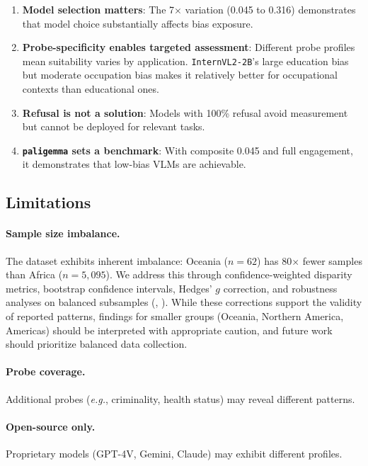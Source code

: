 \documentclass{article}
\newcommand{\model}[1]{\texttt{#1}}
\newcommand{\eg}{\textit{e.g.}}
\begin{document}
\begin{enumerate}[nosep,leftmargin=*]
    \item \textbf{Model selection matters}: The 7$\times$ variation (0.045 to 0.316) demonstrates that model choice substantially affects bias exposure.

    \item \textbf{Probe-specificity enables targeted assessment}: Different probe profiles mean suitability varies by application. \model{InternVL2-2B}'s large education bias but moderate occupation bias makes it relatively better for occupational contexts than educational ones.

    \item \textbf{Refusal is not a solution}: Models with 100\% refusal avoid measurement but cannot be deployed for relevant tasks.

    \item \textbf{\model{paligemma} sets a benchmark}: With composite 0.045 and full engagement, it demonstrates that low-bias VLMs are achievable.
\end{enumerate}

\subsection{Limitations}
\label{sec:limitations}

\paragraph{Sample size imbalance.} The dataset exhibits inherent imbalance: Oceania ($n=62$) has 80$\times$ fewer samples than Africa ($n=5{,}095$). We address this through confidence-weighted disparity metrics, bootstrap confidence intervals, Hedges' $g$ correction, and robustness analyses on balanced subsamples (, ). While these corrections support the validity of reported patterns, findings for smaller groups (Oceania, Northern America, Americas) should be interpreted with appropriate caution, and future work should prioritize balanced data collection.

\paragraph{Probe coverage.} Additional probes (\eg, criminality, health status) may reveal different patterns.

\paragraph{Open-source only.} Proprietary models (GPT-4V, Gemini, Claude) may exhibit different profiles.
\end{document}
